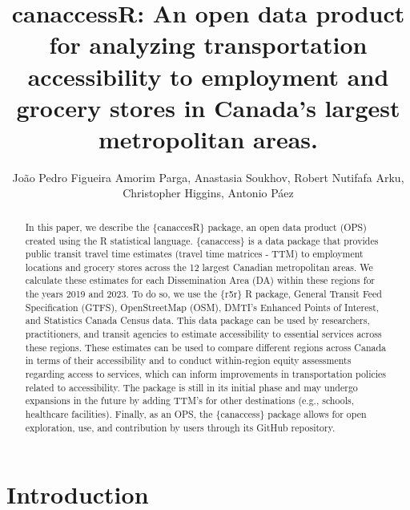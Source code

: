 \documentclass[Royal,times,sageh]{sagej}
\begin{document}

\title{canaccessR: An open data product for analyzing transportation
accessibility to employment and grocery stores in Canada's largest
metropolitan areas.}

\runninghead{}

\author{João Pedro Figueira Amorim Parga\affilnum{}, Anastasia
Soukhov\affilnum{}, Robert Nutifafa Arku\affilnum{}, Christopher
Higgins\affilnum{}, Antonio Páez\affilnum{}}

\affiliation{\affilnum{}{}}



\begin{abstract}
In this paper, we describe the \{canaccesR\} package, an open data
product (OPS) created using the R statistical language. \{canaccess\} is
a data package that provides public transit travel time estimates
(travel time matrices - TTM) to employment locations and grocery stores
across the 12 largest Canadian metropolitan areas. We calculate these
estimates for each Dissemination Area (DA) within these regions for the
years 2019 and 2023. To do so, we use the \{r5r\} R package, General
Transit Feed Specification (GTFS), OpenStreetMap (OSM), DMTI's Enhanced
Points of Interest, and Statistics Canada Census data. This data package
can be used by researchers, practitioners, and transit agencies to
estimate accessibility to essential services across these regions. These
estimates can be used to compare different regions across Canada in
terms of their accessibility and to conduct within-region equity
assessments regarding access to services, which can inform improvements
in transportation policies related to accessibility. The package is
still in its initial phase and may undergo expansions in the future by
adding TTM's for other destinations (e.g., schools, healthcare
facilities). Finally, as an OPS, the \{canaccess\} package allows for
open exploration, use, and contribution by users through its GitHub
repository.
\end{abstract}


\maketitle

\section{Introduction}\label{introduction}
\end{document}

